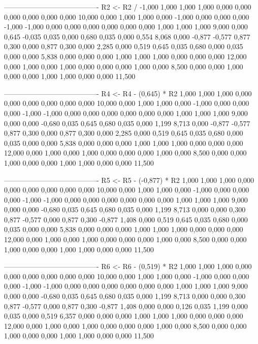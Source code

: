 \documentclass[12pt]{article}
\begin{document}
\begin{enumerate}
\begin{keluaran}
----------------------------------------
R2 <- R2 / -1,000
1,000   1,000   1,000   0,000   0,000   0,000   0,000   0,000   0,000   10,000
0,000   1,000   1,000   0,000   -1,000  0,000   0,000   0,000   -1,000  -1,000
0,000   0,000   0,000   0,000   0,000   0,000   1,000   1,000   1,000   9,000
0,000   0,645   -0,035  0,035   0,000   0,680   0,035   0,000   0,554   8,068
0,000   -0,877  -0,577  0,877   0,300   0,000   0,877   0,300   0,000   2,285
0,000   0,519   0,645   0,035   0,680   0,000   0,035   0,000   0,000   5,838
0,000   0,000   0,000   1,000   1,000   1,000   0,000   0,000   0,000   12,000
0,000   1,000   0,000   1,000   0,000   0,000   0,000   1,000   0,000   8,500
0,000   0,000   1,000   0,000   0,000   1,000   1,000   0,000   0,000   11,500

----------------------------------------
R4 <- R4 - (0,645) * R2
1,000   1,000   1,000   0,000   0,000   0,000   0,000   0,000   0,000   10,000
0,000   1,000   1,000   0,000   -1,000  0,000   0,000   0,000   -1,000  -1,000
0,000   0,000   0,000   0,000   0,000   0,000   1,000   1,000   1,000   9,000
0,000   0,000   -0,680  0,035   0,645   0,680   0,035   0,000   1,199   8,713
0,000   -0,877  -0,577  0,877   0,300   0,000   0,877   0,300   0,000   2,285
0,000   0,519   0,645   0,035   0,680   0,000   0,035   0,000   0,000   5,838
0,000   0,000   0,000   1,000   1,000   1,000   0,000   0,000   0,000   12,000
0,000   1,000   0,000   1,000   0,000   0,000   0,000   1,000   0,000   8,500
0,000   0,000   1,000   0,000   0,000   1,000   1,000   0,000   0,000   11,500

----------------------------------------
R5 <- R5 - (-0,877) * R2
1,000   1,000   1,000   0,000   0,000   0,000   0,000   0,000   0,000   10,000
0,000   1,000   1,000   0,000   -1,000  0,000   0,000   0,000   -1,000  -1,000
0,000   0,000   0,000   0,000   0,000   0,000   1,000   1,000   1,000   9,000
0,000   0,000   -0,680  0,035   0,645   0,680   0,035   0,000   1,199   8,713
0,000   0,000   0,300   0,877   -0,577  0,000   0,877   0,300   -0,877  1,408
0,000   0,519   0,645   0,035   0,680   0,000   0,035   0,000   0,000   5,838
0,000   0,000   0,000   1,000   1,000   1,000   0,000   0,000   0,000   12,000
0,000   1,000   0,000   1,000   0,000   0,000   0,000   1,000   0,000   8,500
0,000   0,000   1,000   0,000   0,000   1,000   1,000   0,000   0,000   11,500

----------------------------------------
R6 <- R6 - (0,519) * R2
1,000   1,000   1,000   0,000   0,000   0,000   0,000   0,000   0,000   10,000
0,000   1,000   1,000   0,000   -1,000  0,000   0,000   0,000   -1,000  -1,000
0,000   0,000   0,000   0,000   0,000   0,000   1,000   1,000   1,000   9,000
0,000   0,000   -0,680  0,035   0,645   0,680   0,035   0,000   1,199   8,713
0,000   0,000   0,300   0,877   -0,577  0,000   0,877   0,300   -0,877  1,408
0,000   0,000   0,126   0,035   1,199   0,000   0,035   0,000   0,519   6,357
0,000   0,000   0,000   1,000   1,000   1,000   0,000   0,000   0,000   12,000
0,000   1,000   0,000   1,000   0,000   0,000   0,000   1,000   0,000   8,500
0,000   0,000   1,000   0,000   0,000   1,000   1,000   0,000   0,000   11,500


\end{keluaran}
\end{enumerate}
\end{document}
